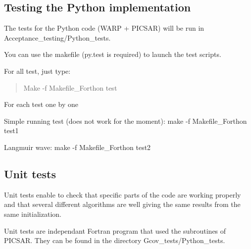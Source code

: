 \subsection*{Testing the Python implementation }

The tests for the Python code (W\+A\+RP + P\+I\+C\+S\+AR) will be run in {\ttfamily Acceptance\+\_\+testing/\+Python\+\_\+tests}.

You can use the makefile (py.\+test is required) to launch the test scripts.

For all test, just type\+:

\begin{quote}
Make -\/f Makefile\+\_\+\+Forthon test \end{quote}


For each test one by one
\begin{DoxyItemize}
\item Simple running test (does not work for the moment)\+: {\ttfamily make -\/f Makefile\+\_\+\+Forthon test1}
\item Langmuir wave\+: {\ttfamily make -\/f Makefile\+\_\+\+Forthon test2}
\end{DoxyItemize}

\subsection*{Unit tests }

Unit tests enable to check that specific parts of the code are working properly and that several different algorithms are well giving the same results from the same initialization.

Unit tests are independant Fortran program that used the subroutines of P\+I\+C\+S\+AR. They can be found in the directory {\ttfamily Gcov\+\_\+tests/\+Python\+\_\+tests}. 